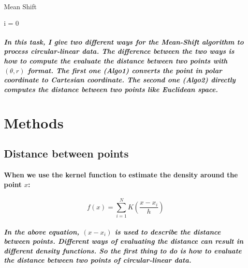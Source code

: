 \documentclass{article}
\begin{document}
\begin{algorithm}[t]
\caption{Mean Shift}
i = 0\\
\end{algorithm}


\subparagraph{
In this task, I give two different ways for the Mean-Shift algorithm to process circular-linear data. The difference between the two ways is how to compute the evaluate the distance between two points with $(\theta, r)$ format. The first one (Algo1) converts the point in polar coordinate to Cartesian coordinate. The second one (Algo2) directly computes the distance between two points like Euclidean space.
}

\section{Methods}

\subsection{Distance between points}
\paragraph{
When we use the kernel function to estimate the density around the point $x$:
}
\begin{equation}
f(x) = \sum_{i=1}^{N}K(\frac{x-x_i}{h})
\end{equation}
\subparagraph{
In the above equation, $(x-x_i)$ is used to describe the \textit{distance} between points. Different ways of evaluating the distance can result in different density functions. So the first thing to do is how to evaluate the distance between two points of circular-linear data.
}
\end{document}
